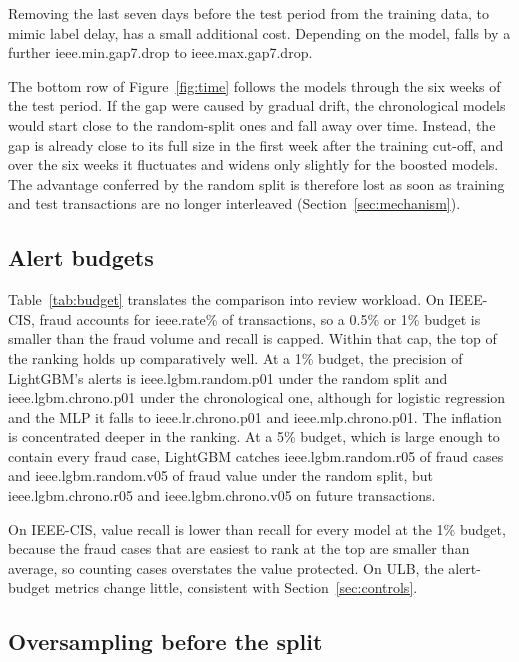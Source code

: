 Removing the last seven days before the test period from the training data, to mimic label delay, has a small additional cost. Depending on the model, \prauc{} falls by a further \num{ieee.min.gap7.drop} to \num{ieee.max.gap7.drop}.

The bottom row of Figure~\ref{fig:time} follows the models through the six weeks of the test period. If the gap were caused by gradual drift, the chronological models would start close to the random-split ones and fall away over time. Instead, the gap is already close to its full size in the first week after the training cut-off, and over the six weeks it fluctuates and widens only slightly for the boosted models. The advantage conferred by the random split is therefore lost as soon as training and test transactions are no longer interleaved (Section~\ref{sec:mechanism}).

\subsection{Alert budgets}



Table~\ref{tab:budget} translates the comparison into review workload. On IEEE-CIS, fraud accounts for \num{ieee.rate}\% of transactions, so a 0.5\% or 1\% budget is smaller than the fraud volume and recall is capped. Within that cap, the top of the ranking holds up comparatively well. At a 1\% budget, the precision of LightGBM's alerts is \num{ieee.lgbm.random.p01} under the random split and \num{ieee.lgbm.chrono.p01} under the chronological one, although for logistic regression and the MLP it falls to \num{ieee.lr.chrono.p01} and \num{ieee.mlp.chrono.p01}. The inflation is concentrated deeper in the ranking. At a 5\% budget, which is large enough to contain every fraud case, LightGBM catches \num{ieee.lgbm.random.r05} of fraud cases and \num{ieee.lgbm.random.v05} of fraud value under the random split, but \num{ieee.lgbm.chrono.r05} and \num{ieee.lgbm.chrono.v05} on future transactions.

On IEEE-CIS, value recall is lower than recall for every model at the 1\% budget, because the fraud cases that are easiest to rank at the top are smaller than average, so counting cases overstates the value protected. On ULB, the alert-budget metrics change little, consistent with Section~\ref{sec:controls}.

\subsection{Oversampling before the split}

